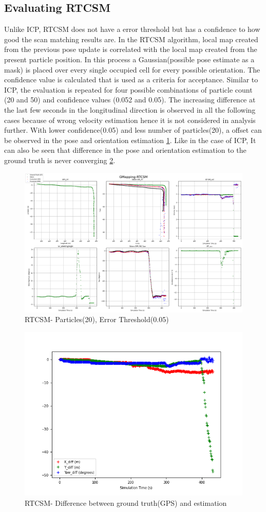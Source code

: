 \subsection{Evaluating RTCSM}
Unlike ICP, RTCSM does not have a error threshold but has a confidence to how good the scan matching results are. In the RTCSM algorithm, local map created from the previous pose update is correlated with the local map created from the present particle position. In this process a Gaussian(possible pose estimate as a mask) is placed over every single occupied cell for every possible orientation. The confidence value is calculated that is used as a criteria for acceptance. Similar to ICP, the evaluation is repeated for four possible combinations of particle count (20 and 50) and confidence values (0.052 and 0.05). The increasing difference at the last few seconds in the longitudinal direction is observed in all the following cases because of wrong velocity estimation hence it is not considered in analysis further.
With lower confidence(0.05) and less number of particles(20), a offset can be observed in the pose and orientation estimation \ref{fig:RTCSM_20_0.05}. Like in the case of ICP, It can also be seen that difference in the pose and orientation estimation to the ground truth is never converging \ref{fig:RTCSM_20_0.05_diff}.
    \begin{figure}[h] 
        \includegraphics[height=0.6\textwidth]{images/GMapping-RTCSM_Map_20_0.05.png}
        \caption{RTCSM- Particles(20), Error Threshold(0.05)}
        \label{fig:RTCSM_20_0.05}
    \end{figure}
    \begin{figure}[h] 
        \includegraphics[height=0.4\textwidth]{images/GMapping-RTCSM_True_vs_Crct_20_0.05.png}
        \caption{RTCSM- Difference between ground truth(GPS) and estimation}
        \label{fig:RTCSM_20_0.05_diff}
    \end{figure}

